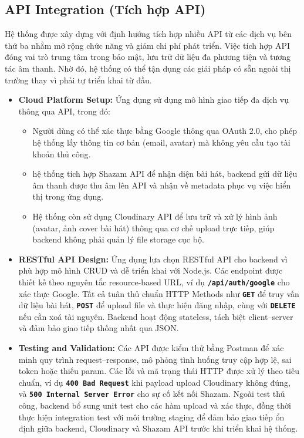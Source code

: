 \subsection{API Integration (Tích hợp API)}
Hệ thống được xây dựng với định hướng tích hợp nhiều API từ các dịch vụ bên thứ ba nhằm mở rộng chức năng và giảm chi phí phát triển. Việc tích hợp API đóng vai trò trung tâm trong bảo mật, lưu trữ dữ liệu đa phương tiện và tương tác âm thanh. Nhờ đó, hệ thống có thể tận dụng các giải pháp có sẵn ngoài thị trường thay vì phải tự triển khai từ đầu.
\begin{itemize}
    \item \textbf{Cloud Platform Setup:} Ứng dụng sử dụng mô hình giao tiếp đa dịch vụ thông qua API, trong đó:
    \begin{itemize}
        \item Người dùng có thể xác thực bằng Google thông qua OAuth 2.0, cho phép hệ thống lấy thông tin cơ bản (email, avatar) mà không yêu cầu tạo tài khoản thủ công.
        \item hệ thống tích hợp Shazam API để nhận diện bài hát, backend gửi dữ liệu âm thanh được thu âm lên API và nhận về metadata phục vụ việc hiển thị trong ứng dụng.
        \item Hệ thống còn sử dụng Cloudinary API để lưu trữ và xử lý hình ảnh (avatar, ảnh cover bài hát) thông qua cơ chế upload trực tiếp, giúp backend không phải quản lý file storage cục bộ.
    \end{itemize}
    \item \textbf{RESTful API Design:} Ứng dụng lựa chọn RESTful API cho backend vì phù hợp mô hình CRUD và dễ triển khai với Node.js. Các endpoint được thiết kế theo nguyên tắc resource-based URL, ví dụ \textbf{\texttt{/api/auth/google}} cho xác thực Google. Tất cả tuân thủ chuẩn HTTP Methods như \textbf{\texttt{GET}} để truy vấn dữ liệu bài hát, \textbf{\texttt{POST}} để upload file và thực hiện đăng nhập, cùng với \textbf{\texttt{DELETE}} nếu cần xoá tài nguyên. Backend hoạt động stateless, tách biệt client–server và đảm bảo giao tiếp thống nhất qua JSON.
    \item \textbf{Testing and Validation:} Các API được kiểm thử bằng Postman để xác minh quy trình request–response, mô phỏng tình huống truy cập hợp lệ, sai token hoặc thiếu param. Các lỗi và mã trạng thái HTTP được xử lý theo tiêu chuẩn, ví dụ \textbf{\texttt{400 Bad Request}} khi payload upload Cloudinary không đúng, và \textbf{\texttt{500 Internal Server Error}} cho sự cố kết nối Shazam. Ngoài test thủ công, backend bổ sung unit test cho các hàm upload và xác thực, đồng thời thực hiện integration test với môi trường staging để đảm bảo giao tiếp ổn định giữa backend, Cloudinary và Shazam API trước khi triển khai hệ thống.
\end{itemize}
